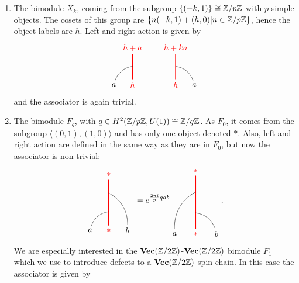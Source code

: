 	\begin{enumerate}
		\item The bimodule $X_k$, coming from the subgroup $\{(-k,1)\}\cong\mathbb{Z}/p\mathbb{Z}$ with $p$ simple objects. The cosets of this group are $\{n(-k,1)+(h,0)|n\in\mathbb{Z}/p\mathbb{Z}\}$, hence the object labels are $h$. Left and right action is given by 
			\begin{equation}
				\begin{tikzpicture}[scale=0.8,baseline=(current bounding box.center)]
				\node[red](m) at (0,0) {$h$};
				\node(b) at (-1,0) {$a$};
				\node[red](abm) at (0,2) {$h+a$};
				\draw[red,line width=0.4mm] (m)-- (abm);
				\draw (b) to [bend left] (0,1);
				\end{tikzpicture}\hspace{20pt}
				\begin{tikzpicture}[scale=0.8,baseline=(current bounding box.center)]
				\node[red](m) at (0,0) {$h$};
				\node(b) at (1,0) {$a$};
				\node[red](abm) at (0,2) {$h+ka$};
				\draw[red,line width=0.4mm] (m)-- (abm);
				\draw (b) to [bend right] (0,1);
				\end{tikzpicture}
			\end{equation}
		\noindent
		and the associator is again trivial.
		\item The bimodule $F_q$, with $q\in H^2(\mathbb{Z}/p\mathbb{Z},U(1))\cong\mathbb{Z}/q\mathbb{Z}$. As $F_0$, it comes from the subgroup $\langle(0,1),(1,0)\rangle$ and has only one object denoted $*$. Also, left and right action are defined in the same way as they are in $F_0$, but now the associator is non-trivial:
			\begin{equation}
				\begin{tikzpicture}[scale=0.8,baseline=(current bounding box.center)]
				\node[red](m) at (0,0) {$*$};
				\node(a) at (-1,0) {$a$};
				\node(b) at (1,0) {$b$};
				\node[red](abm) at (0,3) {$*$};
				\draw[red,line width=0.4mm] (m) -- (abm);
				\draw (a) to [bend left] (0,1);
				\draw (b) to [bend right] (0,2);
				\end{tikzpicture}\ =e^{\frac{2\pi i}{p}qab}
				\begin{tikzpicture}[scale=0.9,baseline=(current bounding box.center)]
				\node[red](m) at (0,0) {$*$};
				\node(a) at (-1,0) {$a$};
				\node(b) at (1,0) {$b$};
				\node[red](abm) at (0,3) {$*$};
				\draw[red,line width=0.4mm] (m) -- (abm);
				\draw (b) to [bend right] (0,1);
				\draw (a) to [bend left] (0,2);
				\end{tikzpicture}.
			\end{equation}
		We are especially interested in the $\textbf{Vec}(\mathbb{Z}/2\mathbb{Z})$-$\textbf{Vec}(\mathbb{Z}/2\mathbb{Z})$ bimodule $F_1$ which we use to introduce defects to a $\textbf{Vec}(\mathbb{Z}/2\mathbb{Z})$ spin chain. In this case the associator is given by

\end{enumerate}
